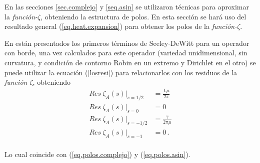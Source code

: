 En las secciones \ref{sec.complejo} y \ref{seq.asin} se utilizaron técnicas para aproximar la {\it función-$\zeta$}, obteniendo la estructura de polos. En esta sección se hará uso del resultado general (\ref{eq.heat.expansion}) para obtener los polos de la {\it función-$\zeta$}.

En \cite{Vassilevich:2003xt} están presentados los primeros términos de Seeley-DeWitt para un operador con borde, una vez calculados para este operador (variedad unidimensional, sin curvatura, y condición de contorno Robin en un extremo y Dirichlet en el otro) se puede utilizar la ecuación (\ref{losresi}) para relacionarlos con los residuos de la {\it función-$\zeta$}, obteniendo
\begin{equation}
\begin{aligned}
Res \  \zeta _A (s)  | _{s=1/2} &= \frac{L \mu}{2 \pi} \\[5pt]
Res \  \zeta _A (s)  | _{s=0} &= 0 \\[5pt]
Res \ \zeta _A (s) | _{s=-1/2} &= \frac{\gamma}{2 \pi \mu} \\[5pt]
Res \  \zeta _A (s) | _{s=-1} &= 0 \, . \\[5pt]
\end{aligned}
\end{equation}


Lo cual coincide con (\ref{eq.polos.complejo}) y (\ref{eq.polos.asin}).
